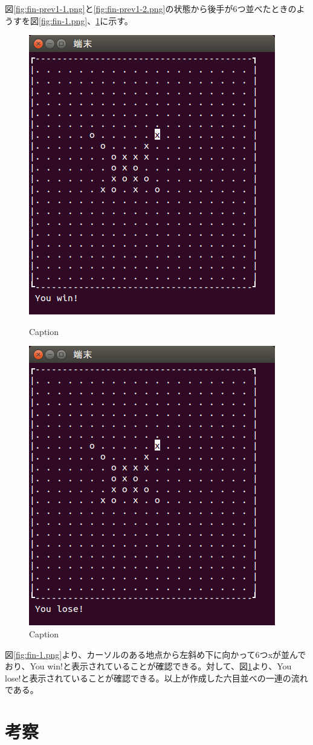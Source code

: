 \documentclass[a4j, titlepage, 10pt]{jsarticle}
\begin{document}
図\ref{fig:fin-prev1-1.png}と\ref{fig:fin-prev1-2.png}の状態から後手が6つ並べたときのようすを図\ref{fig:fin-1.png}、\ref{fig:fin-2.png}に示す。
\begin{figure}[H]
  \begin{minipage}{0.5\hsize}
    \centering
    \includegraphics[scale=0.5]{img/fin-1.png}
    \caption{Caption}
    \label{fig:fin-1.png}
  \end{minipage}
  \begin{minipage}{0.5\hsize}
    \includegraphics[scale=0.5]{img/fin-2.png}
    \caption{Caption}
    \label{fig:fin-2.png}
  \end{minipage}
\end{figure}
図\ref{fig:fin-1.png}より、カーソルのある地点から左斜め下に向かって6つ{\ttfamily x}が並んでおり、{\ttfamily You win!}と表示されていることが確認できる。対して、図\ref{fig:fin-2.png}より、{\ttfamily You lose!}と表示されていることが確認できる。以上が作成した六目並べの一連の流れである。

\section{考察}

\end{document}
